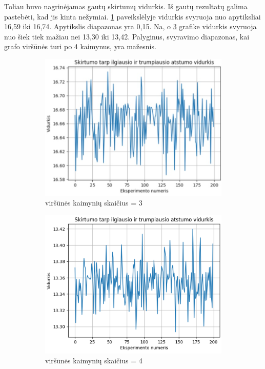 \documentclass[bibliography=totoc]{article}
\begin{document}
Toliau buvo nagrinėjamas gautų skirtumų vidurkis. Iš gautų rezultatų galima pastebėti, kad jis kinta nežymiai. \ref{fig:vidurkis_k3} paveikslėlyje vidurkis svyruoja nuo apytiksliai 16,59 iki 16,74. Apytikslis diapazonas yra 0,15. Na, o \ref{fig:vidurkis_k4} grafike vidurkis svyruoja nuo šiek tiek mažiau nei 13,30 iki 13,42. Palyginus, svyravimo diapazonas, kai grafo viršūnės turi po 4 kaimynus, yra mažesnis.


\begin{figure}[h]
\centering
\begin{subfigure}{.5\textwidth}
  \centering
  \includegraphics[scale = .53]{skirtumo_vidurkis_k3.png}
    \caption{viršūnės kaimynių skaičius = 3}
  \label{fig:vidurkis_k3}
\end{subfigure}%
\begin{subfigure}{.5\textwidth}
  \centering
  \includegraphics[scale = .8]{skirtumo_vidurkis_k4.png}
    \caption{viršūnės kaimynių skaičius = 4}
  \label{fig:vidurkis_k4}
\end{subfigure}
\caption{}
\end{figure}
\end{document}
